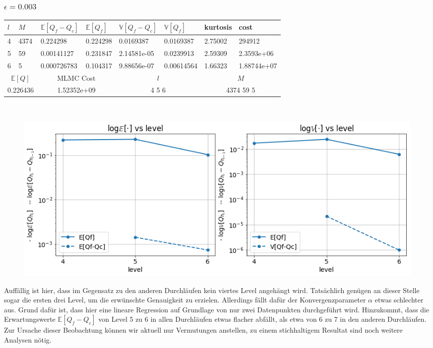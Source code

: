 \subsubsection{$ \epsilon=0.003 $}
\noindent\begin{tabular}{|p{0.15\q}|p{0.55\q}|p{1.4\q}|p{1.05\q}|p{1.35\q}|p{1.25\q}|p{0.9\q}|p{1.35\q}|}
	\hline
	$ l $   &  $ M $  &  $ \mathbb{E}[Q_f-Q_c] $  &   $ \mathbb{E}[Q_f] $ &  $ \mathbb{V}[Q_f-Q_c] $   &   $ \mathbb{V}[Q_f] $ &  kurtosis    &    cost\\
	\hline
	4 & 4374&    0.224298 &   0.224298&   0.0169387 &  0.0169387  &   2.75002 &     294912 \\
	5  &  59 & 0.00141127  &  0.231847 & 2.14581e-05 &  0.0239913  &   2.59309 & 2.3593e+06\\
	6   &  5  &0.000726783  &  0.104317 & 9.88656e-07 & 0.00614564  &   1.66323 &1.88744e+07\\
	\hline
	\multicolumn{2}{|c|}{$ \mathbb{E}[Q] $ }  &  \multicolumn{2}{c|}{MLMC Cost}   & \multicolumn{2}{c|}{$ l $}  &    \multicolumn{2}{c|}{$ M$} \\
	\hline
	\multicolumn{2}{|c|}{0.226436} & \multicolumn{2}{c|}{1.52352e+09  } &  \multicolumn{2}{c|}{   4 5 6 }     & \multicolumn{2}{c|}{4374 59 5}    \\
	\hline 
\end{tabular}\\
\begin{figure}[H]
	\centering
	\includegraphics[width=\textwidth]{plots/eps003.png} 
\end{figure}
Auffällig ist hier, dass im Gegensatz zu den anderen Durchläufen kein viertes Level angehängt wird. Tatsächlich genügen an dieser Stelle sogar die ersten drei Level, um die erwünschte Genauigkeit zu erzielen. Allerdings fällt dafür der Konvergenzparameter $ \alpha $ etwas schlechter aus. Grund dafür ist, dass hier eine lineare Regression auf Grundlage von nur zwei Datenpunkten durchgeführt wird. Hinzukommt, dass die Erwartungswerte $ \mathbb{E}[Q_f-Q_c] $ von Level 5 zu 6 in allen Durchläufen etwas flacher abfällt, als etwa von 6 zu 7 in den anderen Durchläufen. Zur Ursache dieser Beobachtung können wir aktuell nur Vermutungen anstellen, zu einem stichhaltigem Resultat sind noch weitere Analysen nötig.
